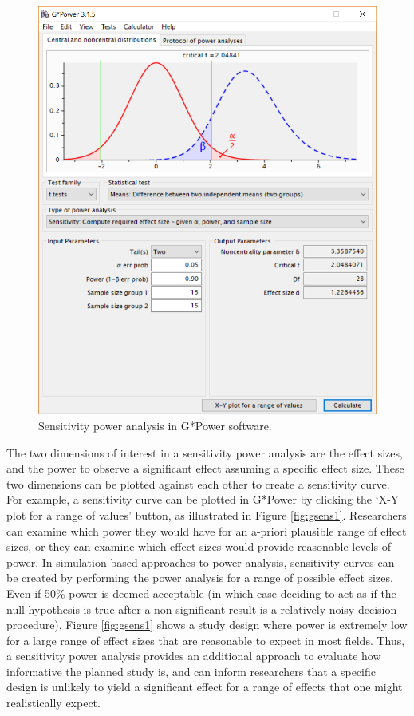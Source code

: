\documentclass[
  oneside]{book}
\begin{document}
\begin{figure}

{\centering \includegraphics[width=1\linewidth]{images/gpow_sensitivity_1} 

}

\caption{Sensitivity power analysis in G*Power software.}\label{fig:gsens0}
\end{figure}

The two dimensions of interest in a sensitivity power analysis are the effect sizes, and the power to observe a significant effect assuming a specific effect size. These two dimensions can be plotted against each other to create a sensitivity curve. For example, a sensitivity curve can be plotted in G*Power by clicking the `X-Y plot for a range of values' button, as illustrated in Figure \ref{fig:gsens1}. Researchers can examine which power they would have for an a-priori plausible range of effect sizes, or they can examine which effect sizes would provide reasonable levels of power. In simulation-based approaches to power analysis, sensitivity curves can be created by performing the power analysis for a range of possible effect sizes. Even if 50\% power is deemed acceptable (in which case deciding to act as if the null hypothesis is true after a non-significant result is a relatively noisy decision procedure), Figure \ref{fig:gsens1} shows a study design where power is extremely low for a large range of effect sizes that are reasonable to expect in most fields. Thus, a sensitivity power analysis provides an additional approach to evaluate how informative the planned study is, and can inform researchers that a specific design is unlikely to yield a significant effect for a range of effects that one might realistically expect.
\end{document}
